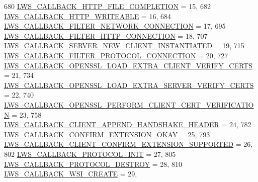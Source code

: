 \begin{DoxyCode}
680         \hyperlink{group__usercb_ggad62860e19975ba4c4af401c3cdb6abf7aa627548e1296e654fcfab463ec3c9587}{LWS\_CALLBACK\_HTTP\_FILE\_COMPLETION}                      = 15,
682         \hyperlink{group__usercb_ggad62860e19975ba4c4af401c3cdb6abf7afedadfb3cde37a8ea4c84ed535f26d09}{LWS\_CALLBACK\_HTTP\_WRITEABLE}                          = 16,
684         \hyperlink{group__usercb_ggad62860e19975ba4c4af401c3cdb6abf7a026502768778b8d79d62dd0fe4375fc6}{LWS\_CALLBACK\_FILTER\_NETWORK\_CONNECTION}                    = 
      17,
695         \hyperlink{group__usercb_ggad62860e19975ba4c4af401c3cdb6abf7a75199176c82c1a56e4a6bbf1cc30c12c}{LWS\_CALLBACK\_FILTER\_HTTP\_CONNECTION}                  = 18,
707         \hyperlink{group__usercb_ggad62860e19975ba4c4af401c3cdb6abf7ae9734e1d7af2abf291665ce9e4a728d3}{LWS\_CALLBACK\_SERVER\_NEW\_CLIENT\_INSTANTIATED}          = 
      19,
715         \hyperlink{group__usercb_ggad62860e19975ba4c4af401c3cdb6abf7accd8753672d319a30b4b4c2fb775e84d}{LWS\_CALLBACK\_FILTER\_PROTOCOL\_CONNECTION}                  = 
      20,
727         \hyperlink{group__usercb_ggad62860e19975ba4c4af401c3cdb6abf7ae4986291b7a810fe290851d73bebeb1c}{LWS\_CALLBACK\_OPENSSL\_LOAD\_EXTRA\_CLIENT\_VERIFY\_CERTS}  
      = 21,
734         \hyperlink{group__usercb_ggad62860e19975ba4c4af401c3cdb6abf7a06006e98d27e1e884364d88317f83493}{LWS\_CALLBACK\_OPENSSL\_LOAD\_EXTRA\_SERVER\_VERIFY\_CERTS}  
      = 22,
740         \hyperlink{group__usercb_ggad62860e19975ba4c4af401c3cdb6abf7ae5ad65d779b7eab32ab67ceff91a3bac}{LWS\_CALLBACK\_OPENSSL\_PERFORM\_CLIENT\_CERT\_VERIFICATION}      
      = 23,
758         \hyperlink{group__usercb_ggad62860e19975ba4c4af401c3cdb6abf7a909cc2a7018864b0b71abacc4058fd8f}{LWS\_CALLBACK\_CLIENT\_APPEND\_HANDSHAKE\_HEADER}          = 
      24,
782         \hyperlink{group__usercb_ggad62860e19975ba4c4af401c3cdb6abf7a390da3639296660a78cc1a5dcb19037e}{LWS\_CALLBACK\_CONFIRM\_EXTENSION\_OKAY}                  = 25,
793         \hyperlink{group__usercb_ggad62860e19975ba4c4af401c3cdb6abf7a1ce5b22039ca37ee224d00047596ea46}{LWS\_CALLBACK\_CLIENT\_CONFIRM\_EXTENSION\_SUPPORTED}          
      = 26,
802         \hyperlink{group__usercb_ggad62860e19975ba4c4af401c3cdb6abf7ad5d34583e3556e153eda91620b48cc49}{LWS\_CALLBACK\_PROTOCOL\_INIT}                            = 27,
805         \hyperlink{group__usercb_ggad62860e19975ba4c4af401c3cdb6abf7a54269ca88508e6efd3afdb9d360a9caa}{LWS\_CALLBACK\_PROTOCOL\_DESTROY}                              = 28,
810         \hyperlink{group__usercb_ggad62860e19975ba4c4af401c3cdb6abf7afd8fd77a1cc9405fcb4f26915d7f2d01}{LWS\_CALLBACK\_WSI\_CREATE}                                  = 29,

\end{DoxyCode}
